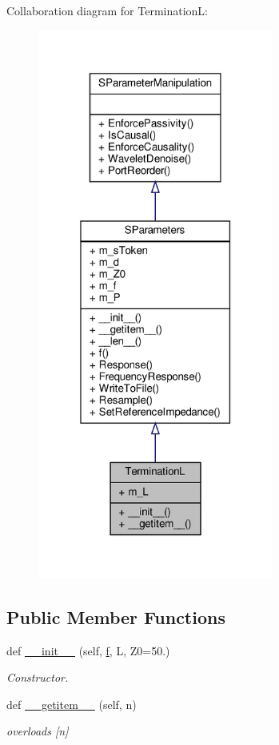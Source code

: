 Collaboration diagram for TerminationL\+:
\nopagebreak
\begin{figure}[H]
\begin{center}
\leavevmode
\includegraphics[width=220pt]{classSignalIntegrity_1_1SParameters_1_1Devices_1_1TerminationL_1_1TerminationL__coll__graph}
\end{center}
\end{figure}
\subsection*{Public Member Functions}
\begin{DoxyCompactItemize}
\item 
def \hyperlink{classSignalIntegrity_1_1SParameters_1_1Devices_1_1TerminationL_1_1TerminationL_ad506006bc5bc92f9e3fdb69c52d64eba}{\+\_\+\+\_\+init\+\_\+\+\_\+} (self, \hyperlink{classSignalIntegrity_1_1SParameters_1_1SParameters_1_1SParameters_a32e7a34d6837fe949b413c852a0447f8}{f}, L, Z0=50.)
\begin{DoxyCompactList}\small\item\em Constructor. \end{DoxyCompactList}\item 
def \hyperlink{classSignalIntegrity_1_1SParameters_1_1Devices_1_1TerminationL_1_1TerminationL_ab7a6da5139e0878b590d68292aaa70f2}{\+\_\+\+\_\+getitem\+\_\+\+\_\+} (self, n)
\begin{DoxyCompactList}\small\item\em overloads \mbox{[}n\mbox{]} \end{DoxyCompactList}\end{DoxyCompactItemize}


